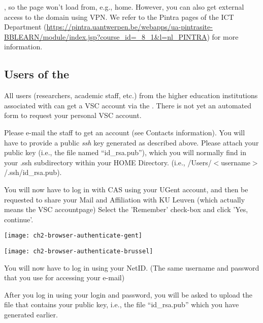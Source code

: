 , so the page won't load from, e.g., home. However, you can also get
external access to the \university domain using VPN. We refer to the Pintra
pages of the ICT Department
(\url{https://pintra.uantwerpen.be/webapps/ua-pintrasite-BBLEARN/module/index.jsp?course_id=_8_1&l=nl_PINTRA})
for more information.

\subsection{Users of the \association}
\label{sec:users-of-association}

All users (researchers, academic staff, etc.) from the higher education
institutions associated with \university can get a VSC account via the \university. There is not
yet an automated form to request your personal VSC account.

Please e-mail the \hpc staff to get an account (see Contacts information).
You will have to provide a public \emph{ssh} key generated as described
above. Please attach your public key (i.e., the file named ``id\_rsa.pub''),
which you will normally find in your .ssh subdirectory within your HOME
Directory. (i.e., /Users/$<$username$>$/.ssh/id\_rsa.pub).


\fi %

\ifgent
  You will now have to log in with CAS using your UGent account, and then be requested
  to share your Mail and Affiliation with KU Leuven (which actually means the VSC accountpage)
  Select the 'Remember' check-box and click 'Yes, continue'.
  \begin{center}
  \texttt{[image: ch2-browser-authenticate-gent]}
  \end{center}
\fi

\ifbrussel
  \begin{center}
  \texttt{[image: ch2-browser-authenticate-brussel]}
  \end{center}

  You will now have to log in using your NetID. (The same username and password that you use for accessing your e-mail)

\fi


After you log in using your \university login and password,
you will be asked to upload the file that contains
your public key, i.e., the file ``id\_rsa.pub'' which you have
generated earlier.


